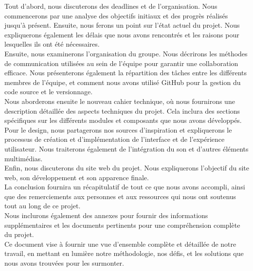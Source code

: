 Tout d'abord, nous discuterons des deadlines et de l'organisation. Nous commencerons par une analyse des objectifs initiaux et des progrès réalisés jusqu'à présent. Ensuite, nous ferons un point sur l'état actuel du projet. Nous expliquerons également les délais que nous avons rencontrés et les raisons pour lesquelles ils ont été nécessaires.
\\

Ensuite, nous examinerons l'organisation du groupe. Nous décrirons les méthodes de communication utilisées au sein de l'équipe pour garantir une collaboration efficace. Nous présenterons également la répartition des tâches entre les différents membres de l'équipe, et comment nous avons utilisé GitHub pour la gestion du code source et le versionnage.
\\

Nous aborderons ensuite le nouveau cahier technique, où nous fournirons une description détaillée des aspects techniques du projet. Cela inclura des sections spécifiques sur les différents modules et composants que nous avons développés.
\\

Pour le design, nous partagerons nos sources d'inspiration et expliquerons le processus de création et d'implémentation de l'interface et de l'expérience utilisateur. Nous traiterons également de l'intégration du son et d'autres éléments multimédias.
\\

Enfin, nous discuterons du site web du projet. Nous expliquerons l'objectif du site web, son développement et son apparence finale.
\\

La conclusion fournira un récapitulatif de tout ce que nous avons accompli, ainsi que des remerciements aux personnes et aux ressources qui nous ont soutenus tout au long de ce projet.
\\

Nous inclurons également des annexes pour fournir des informations supplémentaires et les documents pertinents pour une compréhension complète du projet.
\\

Ce document vise à fournir une vue d'ensemble complète et détaillée de notre travail, en mettant en lumière notre méthodologie, nos défis, et les solutions que nous avons trouvées pour les surmonter.

